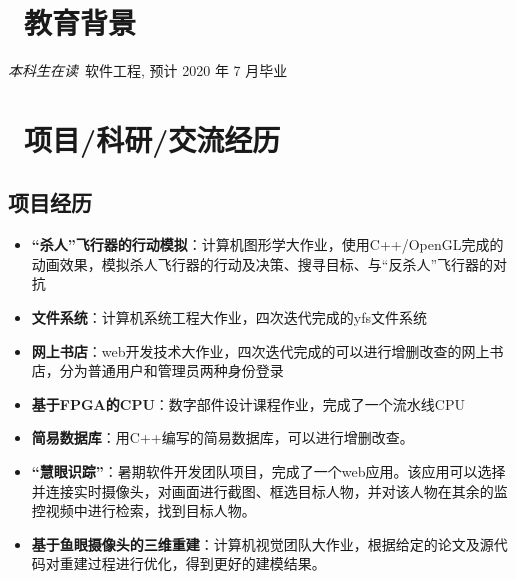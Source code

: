 \documentclass{resume}
\begin{document}


  
\section{\faGraduationCap\  教育背景}
\textit{本科生在读}\ 软件工程, 预计 2020 年 7 月毕业

\section{\faUsers\ 项目/科研/交流经历}
\subsection{\textbf{项目经历}}
\begin{itemize}
  \item \textbf{“杀人”飞行器的行动模拟}：计算机图形学大作业，使用C++/OpenGL完成的动画效果，模拟杀人飞行器的行动及决策、搜寻目标、与“反杀人”飞行器的对抗
  \item \textbf{文件系统}：计算机系统工程大作业，四次迭代完成的yfs文件系统
  \item \textbf{网上书店}：web开发技术大作业，四次迭代完成的可以进行增删改查的网上书店，分为普通用户和管理员两种身份登录
  \item \textbf{基于FPGA的CPU}：数字部件设计课程作业，完成了一个流水线CPU
  \item \textbf{简易数据库}：用C++编写的简易数据库，可以进行增删改查。
\end{itemize}

\begin{itemize}
  \item \textbf{“慧眼识踪”}：暑期软件开发团队项目，完成了一个web应用。该应用可以选择并连接实时摄像头，对画面进行截图、框选目标人物，并对该人物在其余的监控视频中进行检索，找到目标人物。
  \item \textbf{基于鱼眼摄像头的三维重建}：计算机视觉团队大作业，根据给定的论文及源代码对重建过程进行优化，得到更好的建模结果。
  \end{itemize}
\end{document}
